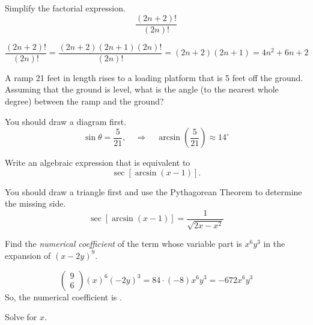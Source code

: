 \documentclass[12pt,addpoints, answers, fleqn]{exam}
\begin{document}
\begin{questions}
\question Simplify the factorial expression.
\[
\frac{\left(2n + 2 \right)!}{\left( 2n\right)!}
\]
\begin{solution}
\[
\frac{\left(2n + 2 \right)!}{\left( 2n\right)!} = \frac{\left(2n + 2 \right) \left(2n + 1 \right) \left(2n\right)!}{\left( 2n\right)!} = \boxed{\left(2n + 2 \right) \left(2n + 1 \right) = 4n^2 + 6n + 2}
\]
\end{solution}
\question A ramp 21 feet in length rises to a loading platform that is 5 feet off the ground. Assuming that the ground is level, what is the angle (to the nearest whole degree) between the ramp and the ground?
\begin{solution} You should draw a diagram first.
\[
\sin \theta = \frac{5}{21}, \quad \Rightarrow \quad \arcsin \left( \frac{5}{21} \right) \approx \boxed{14^\circ}
\]
\end{solution}
\question Write an algebraic expression that is equivalent to
\[
\sec \left[ \arcsin \left( x - 1 \right) \right].
\]
\begin{solution} You should draw a triangle first and use the Pythagorean Theorem to determine the missing side.
\[
\sec \left[ \arcsin \left( x - 1 \right) \right] = \boxed{\frac{1}{\sqrt{2x-x^2}}}
\]
\end{solution}
\question Find the \emph{numerical coefficient} of the term whose variable part is $x^6y^3$ in the expansion of $\left( x - 2y \right)^9$.
\begin{solution}
\[
\left( {\begin{array}{c}
   9  \\
   6
\end{array} } \right) \left(x \right)^6 \left( -2y\right)^3 = 84 \cdot \left( -8\right) x^6y^3 = -672 x^6y^3
\]
So, the numerical coefficient is .
\end{solution}
\question Solve for $x$.
\begin{parts}

\end{parts}
\end{questions}
\end{document}
